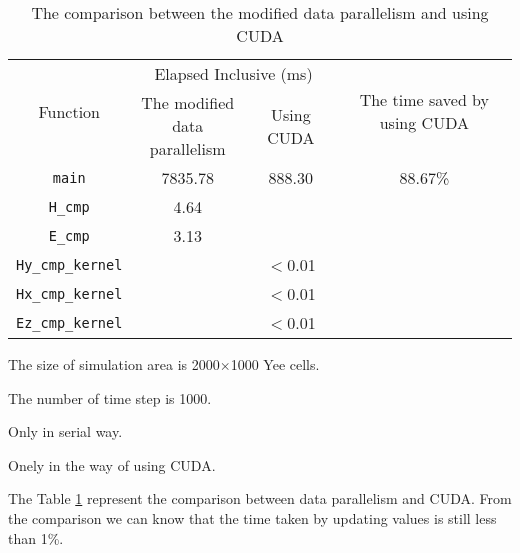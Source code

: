 \begin{table}[hp]
	\centering
	\caption{The comparison between the modified data parallelism and using CUDA}\label{ch4: cuda or new}
\begin{threeparttable}
	\begin{tabular}{cccc}
		\toprule
		\multirow{2}{2em}{Function}&\multicolumn{2}{c}{Elapsed Inclusive (ms)} & \multirow{2}{14em}{The time saved by using CUDA}\\ 
		\cline{2-3}
		& \makecell{The modified\\data parallelism} & Using CUDA & \\ 
		
		\midrule
			\lstinline|main| & 7835.78 & 888.30 & 88.67\% \\
			\lstinline|H_cmp|\tnote{3} & 4.64 &  & \\ 
			\lstinline|E_cmp|\tnote{3} & 3.13 &  & \\
			\lstinline|Hy_cmp_kernel|\tnote{4} &  & $<$0.01 & \\ 
			\lstinline|Hx_cmp_kernel|\tnote{4} &  & $<$0.01 & \\ 
			\lstinline|Ez_cmp_kernel|\tnote{4} &  & $<$0.01 & \\
		\bottomrule
	\end{tabular}
	\begin{tablenotes}
		\item[1] The size of simulation area is 2000$\times$1000 Yee cells.
		\item[2] The number of time step is 1000.
		\item[3] Only in serial way.
		\item[4] Onely in the way of using CUDA.
	\end{tablenotes}
\end{threeparttable}
\end{table}

The Table \ref{ch4: cuda or new} represent the comparison between data parallelism and CUDA. From the comparison we can know that the time taken by updating values is still less than 1\%.

